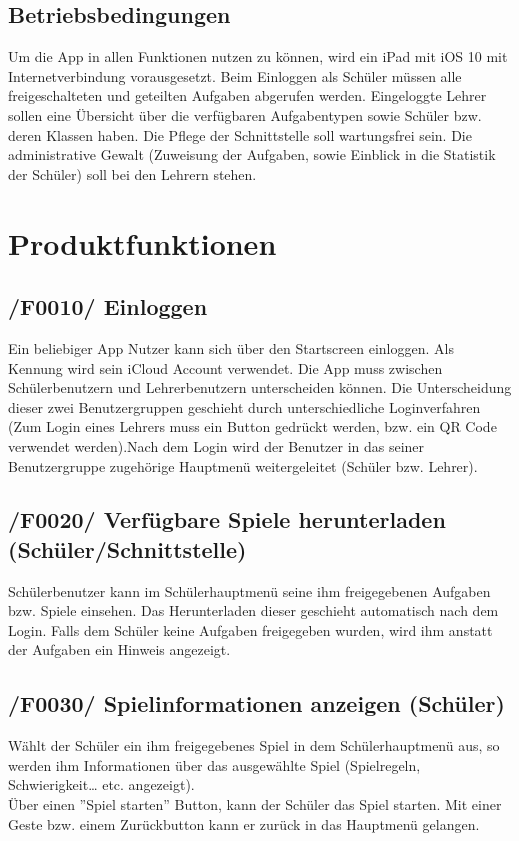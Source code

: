 \subsection{Betriebsbedingungen}
Um die App in allen Funktionen nutzen zu können, wird ein iPad mit iOS 10 mit Internetverbindung vorausgesetzt. Beim Einloggen als Schüler müssen alle freigeschalteten und geteilten Aufgaben abgerufen werden. Eingeloggte Lehrer sollen eine Übersicht über die verfügbaren Aufgabentypen sowie Schüler bzw. deren Klassen haben. Die Pflege der Schnittstelle soll wartungsfrei sein. Die administrative Gewalt (Zuweisung der Aufgaben, sowie Einblick in die Statistik der Schüler) soll bei den Lehrern stehen.



\section{Produktfunktionen}
\subsection{/F0010/ Einloggen}
Ein beliebiger App Nutzer kann sich über den Startscreen einloggen. 
Als Kennung wird sein iCloud Account verwendet. Die App muss zwischen Schülerbenutzern und Lehrerbenutzern unterscheiden können. Die Unterscheidung dieser zwei Benutzergruppen geschieht durch unterschiedliche Loginverfahren (Zum Login eines Lehrers muss ein Button gedrückt werden,  bzw. ein QR Code verwendet werden).Nach dem Login wird der Benutzer in das seiner Benutzergruppe zugehörige Hauptmenü weitergeleitet (Schüler bzw. Lehrer).


\subsection{/F0020/ Verfügbare Spiele herunterladen (Schüler/Schnittstelle)}
Schülerbenutzer kann im Schülerhauptmenü seine ihm freigegebenen Aufgaben bzw. Spiele einsehen. Das Herunterladen dieser geschieht automatisch nach dem Login. Falls dem Schüler keine Aufgaben freigegeben wurden, wird ihm anstatt der Aufgaben ein Hinweis angezeigt.


\subsection{/F0030/ Spielinformationen anzeigen (Schüler)}
Wählt der Schüler ein ihm freigegebenes Spiel in dem Schülerhauptmenü aus, so werden ihm Informationen über das ausgewählte Spiel (Spielregeln, Schwierigkeit… etc. angezeigt).\\
Über einen ''Spiel starten'' Button, kann der Schüler das Spiel starten. Mit einer Geste bzw. einem Zurückbutton kann er zurück in das Hauptmenü gelangen.


